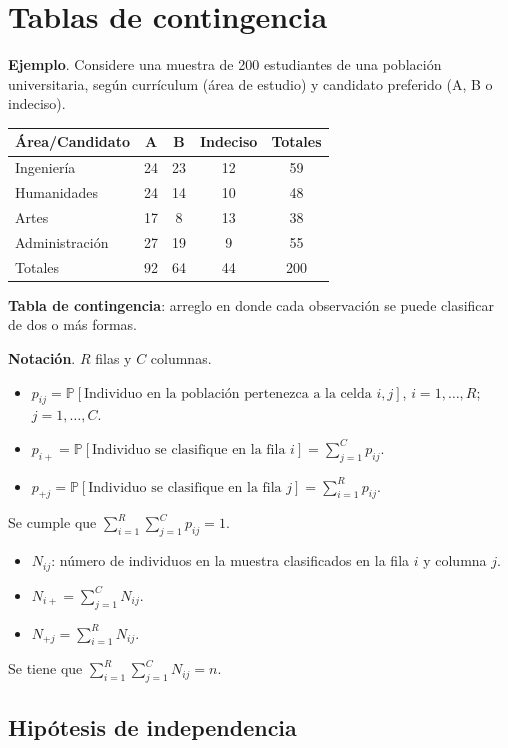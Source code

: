 \documentclass[
  12pt,
]{book}
\begin{document}
\hypertarget{tablas-de-contingencia}{%
\chapter{Tablas de contingencia}\label{tablas-de-contingencia}}

\textbf{Ejemplo}. Considere una muestra de 200 estudiantes de una población universitaria, según currículum (área de estudio) y candidato preferido (A, B o indeciso).

\begin{longtable}[]{@{}lcccc@{}}
\toprule
Área/Candidato & A & B & Indeciso & Totales\tabularnewline
\midrule
\endhead
Ingeniería & 24 & 23 & 12 & 59\tabularnewline
Humanidades & 24 & 14 & 10 & 48\tabularnewline
Artes & 17 & 8 & 13 & 38\tabularnewline
Administración & 27 & 19 & 9 & 55\tabularnewline
Totales & 92 & 64 & 44 & 200\tabularnewline
\bottomrule
\end{longtable}

\textbf{Tabla de contingencia}: arreglo en donde cada observación se puede clasificar de dos o más formas.

\textbf{Notación}. \(R\) filas y \(C\) columnas.

\begin{itemize}
\item
  \(p_{ij} = \mathbb P[\text{Individuo en la población pertenezca a la celda }i,j]\), \(i=1,\dots,R\); \(j=1,\dots, C\).
\item
  \(p_{i+} = \mathbb P[\text{Individuo se clasifique en la fila }i] = \sum_{j=1}^C p_{ij}\).
\item
  \(p_{+j} = \mathbb P[\text{Individuo se clasifique en la fila }j] = \sum_{i=1}^R p_{ij}\).
\end{itemize}

Se cumple que \(\sum_{i=1}^R\sum_{j=1}^Cp_{ij} = 1\).

\begin{itemize}
\item
  \(N_{ij}\): número de individuos en la muestra clasificados en la fila \(i\) y columna \(j\).
\item
  \(N_{i+} = \sum_{j=1}^CN_{ij}\).
\item
  \(N_{+j} = \sum_{i=1}^RN_{ij}\).
\end{itemize}

Se tiene que \(\sum_{i=1}^R\sum_{j=1}^C N_{ij} = n\).

\hypertarget{hipuxf3tesis-de-independencia}{%
\section{Hipótesis de independencia}\label{hipuxf3tesis-de-independencia}}
\end{document}
